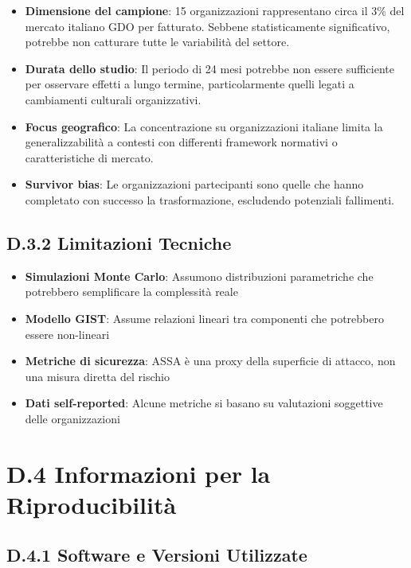 \begin{itemize}
    \item \textbf{Dimensione del campione}: 15 organizzazioni rappresentano circa il 3\% del mercato italiano GDO per fatturato. Sebbene statisticamente significativo, potrebbe non catturare tutte le variabilità del settore.
    
    \item \textbf{Durata dello studio}: Il periodo di 24 mesi potrebbe non essere sufficiente per osservare effetti a lungo termine, particolarmente quelli legati a cambiamenti culturali organizzativi.
    
    \item \textbf{Focus geografico}: La concentrazione su organizzazioni italiane limita la generalizzabilità a contesti con differenti framework normativi o caratteristiche di mercato.
    
    \item \textbf{Survivor bias}: Le organizzazioni partecipanti sono quelle che hanno completato con successo la trasformazione, escludendo potenziali fallimenti.
\end{itemize}

\subsection{D.3.2 Limitazioni Tecniche}

\begin{itemize}
    \item \textbf{Simulazioni Monte Carlo}: Assumono distribuzioni parametriche che potrebbero semplificare la complessità reale
    \item \textbf{Modello GIST}: Assume relazioni lineari tra componenti che potrebbero essere non-lineari
    \item \textbf{Metriche di sicurezza}: ASSA è una proxy della superficie di attacco, non una misura diretta del rischio
    \item \textbf{Dati self-reported}: Alcune metriche si basano su valutazioni soggettive delle organizzazioni
\end{itemize}

\section{D.4 Informazioni per la Riproducibilità}

\subsection{D.4.1 Software e Versioni Utilizzate}


